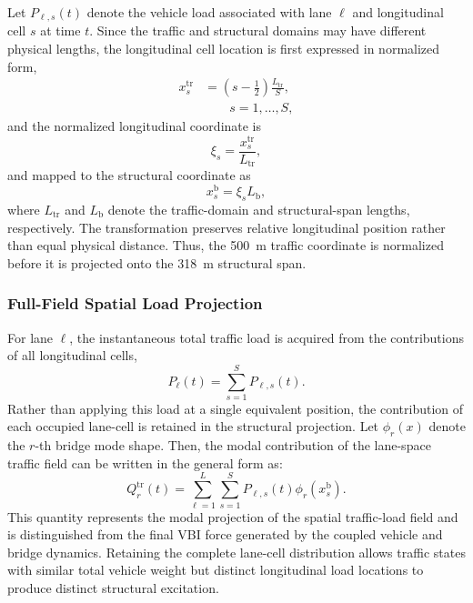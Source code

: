 \documentclass[journal]{IEEEtran}
\begin{document}
Let $P_{\ell,s}(t)$ denote the vehicle load associated with lane $\ell$ and longitudinal cell $s$ at time $t$. Since the traffic and structural domains may have different physical lengths, the longitudinal cell location is first expressed in normalized form,
\begin{equation}
\begin{aligned}
x_s^{\mathrm{tr}}&=\left(s-\frac{1}{2}\right)\frac{L_{\mathrm{tr}}}{S},\\
&\qquad s=1,\ldots,S,
\end{aligned}
\label{eq:traffic_cell_center}
\end{equation}
and the normalized longitudinal coordinate is
\begin{equation}
\xi_s=\frac{x_s^{\mathrm{tr}}}{L_{\mathrm{tr}}},
\label{eq:normalized_cell_coordinate}
\end{equation}
and mapped to the structural coordinate as
\begin{equation}
x_s^{\mathrm{b}}=\xi_s L_{\mathrm{b}},
\end{equation}
where $L_{\mathrm{tr}}$ and $L_{\mathrm{b}}$ denote the traffic-domain and structural-span lengths, respectively. The transformation preserves relative longitudinal position rather than equal physical distance. Thus, the 500~m traffic coordinate is normalized before it is projected onto the 318~m structural span.

\subsubsection{Full-Field Spatial Load Projection}

For lane $\ell$, the instantaneous total traffic load is acquired from the contributions of all longitudinal cells,
\begin{equation}
P_{\ell}(t)=\sum_{s=1}^{S}P_{\ell,s}(t).
\end{equation}
Rather than applying this load at a single equivalent position, the contribution of each occupied lane-cell is retained in the structural projection. Let $\phi_r(x)$ denote the $r$-th bridge mode shape. Then, the modal contribution of the lane-space traffic field can be written in the general form as:
\begin{equation}
Q_r^{\mathrm{tr}}(t)=\sum_{\ell=1}^{L}\sum_{s=1}^{S}P_{\ell,s}(t)\phi_r\left(x_s^{\mathrm{b}}\right).
\end{equation}
This quantity represents the modal projection of the spatial traffic-load field and is distinguished from the final VBI force generated by the coupled vehicle and bridge dynamics. Retaining the complete lane-cell distribution allows traffic states with similar total vehicle weight but distinct longitudinal load locations to produce distinct structural excitation.
\end{document}
